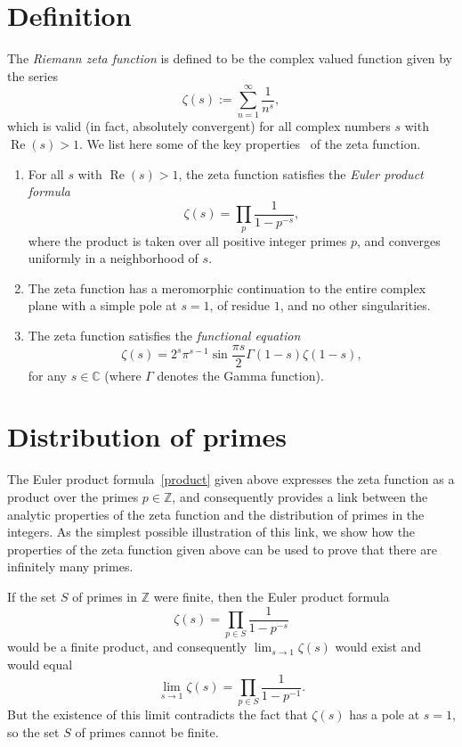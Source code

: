 \documentclass[12pt]{article}
\newcommand{\C}{\mathbb{C}}
\newcommand{\Z}{\mathbb{Z}}
\renewcommand{\Re}{\operatorname{Re}}
\theoremstyle{definition}
\begin{document}
\section{Definition}

The \emph{Riemann zeta function} is defined to be the complex valued
function given by the series
\begin{equation}\label{def}
\zeta(s) := \sum_{n=1}^\infty \frac{1}{n^s},
\end{equation}
which is valid (in fact, absolutely convergent) for all complex
numbers $s$ with $\Re(s) > 1$. We list here some of the key
properties~\cite{ahlfors} of the zeta function.
\begin{enumerate}
\item For all $s$ with $\Re(s) > 1$, the zeta function satisfies the
\emph{Euler product formula}
\begin{equation}\label{product}
\zeta(s) = \prod_{p} \frac{1}{1 - p^{-s}},
\end{equation}
where the product is taken over all positive integer primes $p$, and converges
uniformly in a neighborhood of $s$.
\item The zeta function has a meromorphic continuation to the entire
complex plane with a simple pole at $s=1$, of residue $1$, and no
other singularities.
\item The zeta function satisfies the \emph{functional equation}
\begin{equation}\label{functional}
\zeta(s) = 2^s \pi^{s-1} \sin \frac{\pi s}{2} \Gamma(1-s) \zeta(1-s),
\end{equation}
for any $s \in \C$ (where $\Gamma$ denotes the Gamma function).
\end{enumerate}

\section{Distribution of primes}

The Euler product formula~\eqref{product} given above expresses the
zeta function as a product over the primes $p \in \Z$, and
consequently provides a link between the analytic properties of the
zeta function and the distribution of primes in the integers. As the
simplest possible illustration of this link, we show how the
properties of the zeta function given above can be used to prove that
there are infinitely many primes.

If the set $S$ of primes in $\Z$ were finite, then the Euler product
formula
$$
\zeta(s) = \prod_{p \in S} \frac{1}{1 - p^{-s}}
$$
would be a finite product, and consequently $\lim_{s \to 1} \zeta(s)$
would exist and would equal
$$
\lim_{s \to 1} \zeta(s) = \prod_{p \in S} \frac{1}{1 - p^{-1}}.
$$
But the existence of this limit contradicts the fact that $\zeta(s)$
has a pole at $s=1$, so the set $S$ of primes cannot be finite.
\end{document}
